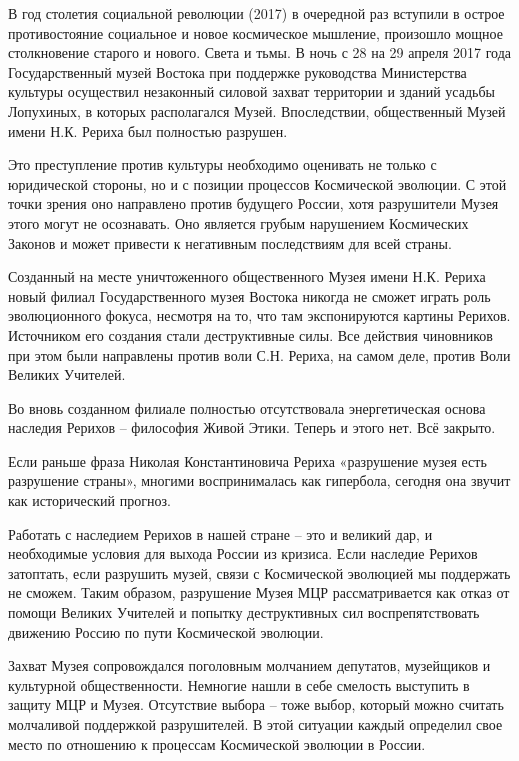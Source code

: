 \begin{itemize}
\begin{itemize}
В год столетия социальной революции (2017) в очередной раз вступили в острое
противостояние социальное и новое космическое мышление, произошло мощное
столкновение старого и нового. Света и тьмы. В ночь с 28 на 29 апреля 2017 года
Государственный музей Востока при поддержке руководства Министерства культуры
осуществил незаконный силовой захват территории и зданий усадьбы Лопухиных, в
которых располагался Музей. Впоследствии, общественный Музей имени Н.К. Рериха
был полностью разрушен.

Это преступление против культуры необходимо оценивать не только с юридической
стороны, но и с позиции процессов Космической эволюции. С этой точки зрения оно
направлено против будущего России, хотя разрушители Музея этого могут не
осознавать. Оно является грубым нарушением Космических Законов и может привести
к негативным последствиям для всей страны.

Созданный на месте уничтоженного общественного Музея имени Н.К. Рериха новый
филиал Государственного музея Востока никогда не сможет играть роль
эволюционного фокуса, несмотря на то, что там экспонируются картины Рерихов.
Источником его создания стали деструктивные силы. Все действия чиновников при
этом были направлены против воли С.Н. Рериха, на самом деле, против Воли
Великих Учителей.

Во вновь созданном филиале полностью отсутствовала энергетическая основа
наследия Рерихов – философия Живой Этики. Теперь и этого нет. Всё закрыто.

Если раньше фраза Николая Константиновича Рериха «разрушение музея есть
разрушение страны», многими воспринималась как гипербола, сегодня она звучит
как исторический прогноз.

Работать с наследием Рерихов в нашей стране – это и великий дар, и необходимые
условия для выхода России из кризиса. Если наследие Рерихов затоптать, если
разрушить музей, связи с Космической эволюцией мы поддержать не сможем. Таким
образом, разрушение Музея МЦР рассматривается как отказ от помощи Великих
Учителей и попытку деструктивных сил воспрепятствовать движению Россию по пути
Космической эволюции.

Захват Музея сопровождался поголовным молчанием депутатов, музейщиков и
культурной общественности. Немногие нашли в себе смелость выступить в защиту
МЦР и Музея. Отсутствие выбора – тоже выбор, который можно считать молчаливой
поддержкой разрушителей. В этой ситуации каждый определил свое место по
отношению к процессам Космической эволюции в России.


\end{itemize}
\end{itemize}
